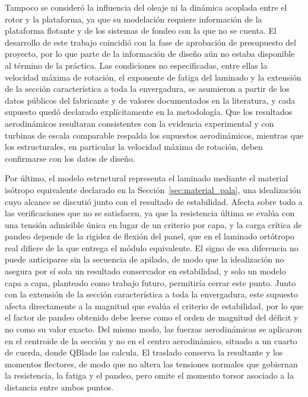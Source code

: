 Tampoco se consideró la influencia del oleaje ni la dinámica acoplada entre el rotor y la plataforma, ya que su modelación requiere información de la plataforma flotante y de los sistemas de fondeo con la que no se cuenta. El desarrollo de este trabajo coincidió con la fase de aprobación de presupuesto del proyecto, por lo que parte de la información de diseño aún no estaba disponible al término de la práctica. Las condiciones no especificadas, entre ellas la velocidad máxima de rotación, el exponente de fatiga del laminado y la extensión de la sección característica a toda la envergadura, se asumieron a partir de los datos públicos del fabricante y de valores documentados en la literatura, y cada supuesto quedó declarado explícitamente en la metodología. Que los resultados aerodinámicos resultaran consistentes con la evidencia experimental y con turbinas de escala comparable respalda los supuestos aerodinámicos, mientras que los estructurales, en particular la velocidad máxima de rotación, deben confirmarse con los datos de diseño.

Por último, el modelo estructural representa el laminado mediante el material isótropo equivalente declarado en la Sección~\ref{sec:material_pala}, una idealización cuyo alcance se discutió junto con el resultado de estabilidad. Afecta sobre todo a las verificaciones que no se satisfacen, ya que la resistencia última se evalúa con una tensión admisible única en lugar de un criterio por capa, y la carga crítica de pandeo depende de la rigidez de flexión del panel, que en el laminado ortótropo real difiere de la que entrega el módulo equivalente. El signo de esa diferencia no puede anticiparse sin la secuencia de apilado, de modo que la idealización no asegura por sí sola un resultado conservador en estabilidad, y solo un modelo capa a capa, planteado como trabajo futuro, permitiría cerrar este punto. Junto con la extensión de la sección característica a toda la envergadura, este supuesto afecta directamente a la magnitud que evalúa el criterio de estabilidad, por lo que el factor de pandeo obtenido debe leerse como el orden de magnitud del déficit y no como su valor exacto. Del mismo modo, las fuerzas aerodinámicas se aplicaron en el centroide de la sección y no en el centro aerodinámico, situado a un cuarto de cuerda, donde QBlade las calcula. El traslado conserva la resultante y los momentos flectores, de modo que no altera las tensiones normales que gobiernan la resistencia, la fatiga y el pandeo, pero omite el momento torsor asociado a la distancia entre ambos puntos.


